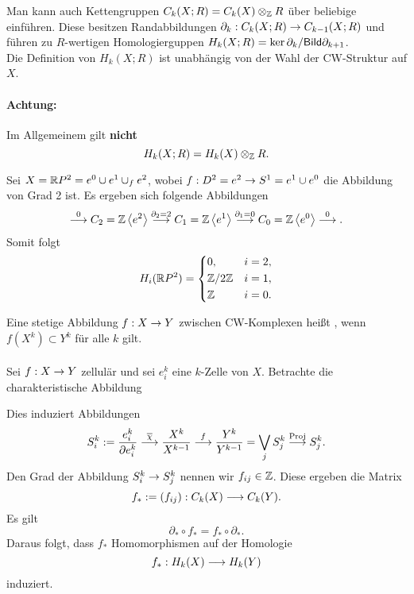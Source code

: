 
\Bem{}
Man kann auch Kettengruppen $C_k(X;R) = C_k(X) \otimes_{\mathbb{Z}} R $ über beliebige  einführen. Diese besitzen Randabbildungen $\partial_k : C_k(X;R) \overset{}{\rightarrow} C_{k-1}(X;R)$ und führen zu $R$-wertigen Homologierguppen $H_k(X;R) = \ker \partial_k / \textsf{Bild} \partial_{k+1}$.\\
Die Definition von $H_k(X;R)$ ist unabhängig von der Wahl der CW-Struktur auf $X$.
\paragraph{Achtung: }Im Allgemeinem gilt \textbf{nicht}
\[ H_k(X;R) = H_k(X)\otimes_{\mathbb{Z}} R. \]

\Bsp{}
Sei $X = \mathbb{R} P^2 = e^0 \cup e^1 \cup_f e^2$, wobei $f : D^2 = e^2 \overset{}{\rightarrow} S^1 = e^1 \cup e^0$ die Abbildung von Grad 2 ist. Es ergeben sich folgende Abbildungen
\[ \overset{0}{\longrightarrow} C_2 = \mathbb{Z}\left<e^2\right> \overset{\partial_2 = 2}{\longrightarrow} C_1 = \mathbb{Z}\left<e^1\right> \overset{\partial_1 = 0}{\longrightarrow} C_0 = \mathbb{Z} \left<e^0\right> \overset{0}{\longrightarrow}.  \]
Somit folgt
\begin{align*}
H_i(\mathbb{R} P^2) = \left\lbrace
\begin{aligned}
&0,&&i=2,\\
&\mathbb{Z}/2\mathbb{Z} && i= 1,\\
&\mathbb{Z} && i = 0.
\end{aligned} 
\right.
\end{align*}

Eine stetige Abbildung $f :X \overset{}{\rightarrow} Y$ zwischen CW-Komplexen heißt , wenn $f(X^k) \subset Y^k$ für alle $k$ gilt.\\\\

Sei $f : X \overset{}{\rightarrow} Y$ zellulär und sei $e_i^k$ eine $k$-Zelle von $X$. Betrachte die charakteristische Abbildung
	\begin{center}
\end{center}
Dies induziert Abbildungen
\[ S_i^k := \frac{e_i^k}{\partial e_i^k} \overset{\overline{\chi}}{\longrightarrow} \frac{X^k}{X^{k-1}} \overset{f}{\longrightarrow} \frac{Y^k}{Y^{k-1}} = \bigvee_j S_j^k \overset{\text{Proj}}{\longrightarrow} S^k_j. \]
Den Grad der Abbildung $S_i^k \overset{}{\rightarrow} S_j^k$ nennen wir $f_{ij} \in \mathbb{Z}$. Diese ergeben die Matrix
\[ f_* := (f_{ij}) : C_k(X) \overset{}{\longrightarrow} C_k(Y). \]
Es gilt
\[ \partial_* \circ f_* = f_* \circ \partial_*. \]
Daraus folgt, dass $f_*$ Homomorphismen auf der Homologie
\[ f_* : H_k(X) \overset{}{\longrightarrow} H_k(Y) \]
induziert.

